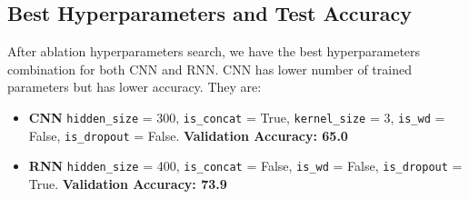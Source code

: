 \documentclass[10pt,a4paper]{article}
\begin{document}
\subsection{Best Hyperparameters and Test Accuracy}
After ablation hyperparameters search, we have the best hyperparameters combination for both CNN and RNN. CNN has lower number of trained parameters but has lower accuracy. They are:
\begin{itemize}
\item \textbf{CNN}	\texttt{hidden\_size} = 300, \texttt{is\_concat} = True, \texttt{kernel\_size} = 3, \texttt{is\_wd} = False, \texttt{is\_dropout} = False. \textbf{Validation Accuracy: 65.0}  
\item \textbf{RNN}	\texttt{hidden\_size} = 400, \texttt{is\_concat} = False,  \texttt{is\_wd} = False, \texttt{is\_dropout} = True. \textbf{Validation Accuracy: 73.9}  
\end{itemize}
 
\end{document}

